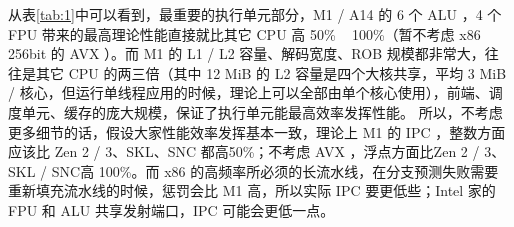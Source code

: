 \documentclass[a4paper]{article}
\begin{document}
\begin{table}[]
  \centering
  \caption{架构对比}
  \label{tab:1}
\end{table}

从表\ref{tab:1}中可以看到，最重要的执行单元部分，M1 / A14 的 6 个 ALU ，4 个 FPU 带来的最高理论性能直接就比其它 CPU 高 50\% ~ 100\%（暂不考虑 x86 256bit 的 AVX ）。而 M1 的 L1 / L2 容量、解码宽度、ROB 规模都非常大，往往是其它 CPU 的两三倍（其中 12 MiB 的 L2 容量是四个大核共享，平均 3  MiB / 核心，但运行单线程应用的时候，理论上可以全部由单个核心使用），前端、调度单元、缓存的庞大规模，保证了执行单元能最高效率发挥性能。
所以，不考虑更多细节的话，假设大家性能效率发挥基本一致，理论上 M1 的 IPC ，整数方面应该比 Zen 2 / 3、SKL、SNC 都高50\%；不考虑 AVX ，浮点方面比Zen 2 / 3、SKL / SNC高 100\%。而 x86 的高频率所必须的长流水线，在分支预测失败需要重新填充流水线的时候，惩罚会比 M1 高，所以实际 IPC 要更低些；Intel 家的 FPU 和 ALU 共享发射端口，IPC 可能会更低一点。
\end{document}
